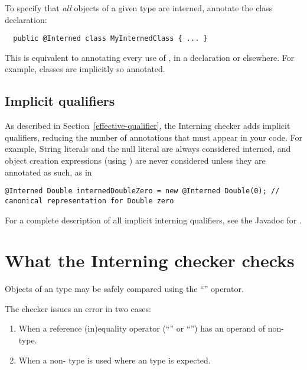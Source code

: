 To specify that \emph{all} objects of a given type are interned, annotate the
class declaration:

\begin{Verbatim}
  public @Interned class MyInternedClass { ... }
\end{Verbatim}

This is equivalent to annotating every use of , in a
declaration or elsewhere.  For example,  classes are implicitly
so annotated.


\subsection{Implicit qualifiers\label{interning-implicit-qualifiers}}

As described in Section~\ref{effective-qualifier}, the Interning checker
adds implicit qualifiers, reducing the number of annotations that must
appear in your code.
For example, String literals and the null literal are always considered interned, and
object creation expressions (using ) are never considered
 unless they are annotated as such, as in

\begin{smaller}
\begin{Verbatim}
@Interned Double internedDoubleZero = new @Interned Double(0); // canonical representation for Double zero
\end{Verbatim}
\end{smaller}

For a complete description of all implicit interning qualifiers, see the
Javadoc for .


\section{What the Interning checker checks\label{interning-checks}}

Objects of an  type may be safely compared using the ``\code{==}''
operator.

The checker issues an error in two cases:

\begin{enumerate}

\item
  When a reference (in)equality operator (``\code{==}'' or ``\code{!=}'')
  has an operand of non- type.

\item
  When a non- type is used where an  type
  is expected.

\end{enumerate}

